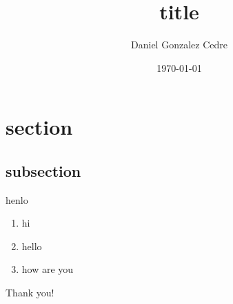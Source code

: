 

\title{title}
\author[Daniel Gonzalez Cedre]{Daniel Gonzalez Cedre}
\date{\today}



  \maketitle

  \section{section}
  \subsection{subsection}

  \begin{frame}[standout]
    henlo
  \end{frame}

  \begin{frame}{\secname \hfill \subsecname}
      \begin{enumerate}
        \item<1->
          hi
        \item<2->
          hello
        \item<3->
          how are you
      \end{enumerate}
  \end{frame}

  \begin{frame}[standout]
      \begin{center}
        \LARGE
        Thank you!
      \end{center}
  \end{frame}


